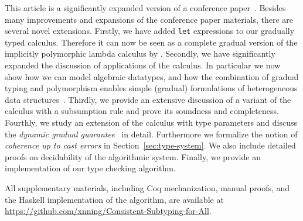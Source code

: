 This article is a significantly expanded version of a conference
paper~\citep{xie2018consistent}. Besides many improvements and expansions of
the conference paper materials, there are several novel extensions. Firstly, we
have added \lstinline{let} expressions to our gradually typed calculus. Therefore
it can now be seen as a complete gradual
version of the implicitly polymorphic lambda calculus by \citet{odersky1996putting}.
Secondly, we have
significantly expanded the discussion of applications of the calculus. In
particular we now show how we can model algebraic datatypes, and how the
combination of gradual typing and polymorphism enables simple
(gradual) formulations
of heterogeneous data structures~\citep{kiselyov2004strongly,
  mcbride2002faking}. Thirdly, we provide an extensive discussion of a
variant of the calculus with a subsumption rule and prove its soundness and
completeness. %
Fourthly, we study an extension of the calculus with type parameters and
discuss the \emph{dynamic gradual guarantee}~\citep{siek2015refined} in detail. Furthermore we 
formalize the notion of \emph{coherence up to cast errors} in Section~\ref{sec:type-system}.
We also include detailed proofs on decidability of the algorithmic system.
Finally, we
provide an implementation of our type checking algorithm.

All supplementary materials, including Coq mechanization, manual proofs, and the
Haskell implementation of the algorithm, are available at
\url{https://github.com/xnning/Consistent-Subtyping-for-All}.






